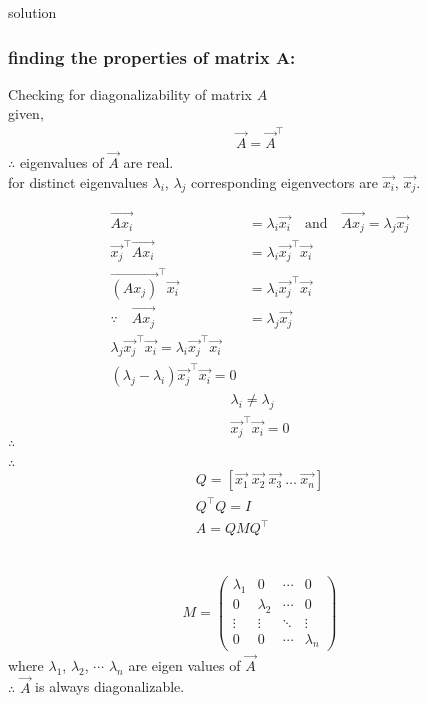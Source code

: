 \documentclass{beamer}
\begin{document}
\begin{frame}{solution}
    \frametitle{finding the properties of matrix A:}
Checking for diagonalizability of matrix $A$ \\
given,
\begin{align}
\vec{A} = \vec{A}^\top
\end{align}
$\therefore$ eigenvalues of $\vec{A}$ are real.\\
for distinct eigenvalues $\lambda_i$, $\lambda_j$ corresponding eigenvectors are $\vec{x_i}$, $\vec{x_j}$.
\end{frame}
\begin{frame}
\begin{align}
\vec{Ax_i} &= \lambda_i \vec{x_i} \quad \text{and} \quad \vec{Ax_j} = \lambda_j \vec{x_j} 
\\\vec{x_j}^\top \vec{A x_i} &= \lambda_i \vec{x_j}^\top \vec{x_i} \\
\vec{(Ax_j)}^\top \vec{x_i} &= \lambda_i \vec{x_j}^\top \vec{x_i}\\
\because \quad \vec{Ax_j} &= \lambda_j \vec{x_j}\\
\lambda_j \vec{x_j}^\top \vec{x_i} = \lambda_i \vec{x_j}^\top \vec{x_i}\\
(\lambda_j - \lambda_i) \vec{x_j}^\top \vec{x_i} = 0
\end{align}
\begin{align}
\lambda_i \neq \lambda_j \\
\vec{x_j}^\top\vec{x_i}=0
\end{align}
$\therefore$ 
\end{frame}
\begin{frame}
$\therefore$ \\
\begin{align}
Q = [\vec{x_1} \ \vec{x_2} \ \vec{x_3} \ \dots \ \vec{x_n}] \\
Q^\top Q = I\\
A = Q MQ^\top
\end{align}
\\
\end{frame}
\begin{frame}
\begin{align}
M = 
\begin{pmatrix}
\lambda_{1} & 0 & \cdots & 0 \\
0 & \lambda_{2} & \cdots & 0 \\
\vdots & \vdots & \ddots & \vdots \\
0 & 0 & \cdots & \lambda_{n}
\end{pmatrix}
\end{align}
where $\lambda_1$, $\lambda_2$, $\cdots$ $\lambda_n$ are eigen values of $\vec{A}$\\
$\therefore$ $\vec{A}$ is always diagonalizable.
\end{frame}
\end{document}
